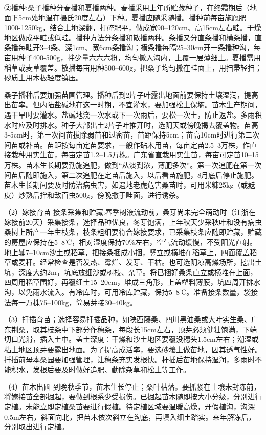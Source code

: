 \documentclass{ctexbook}
\begin{document}
②播种:桑子播种分春播和夏播两种。春播采用上年所贮藏种子，在终霜期后（地面下5cm处地温在摄氏20度左右）下种。夏播应随采随播。播种前每亩施厩肥1000-1250kg，结合土地深翻，打碎耙平，做成宽90--120cm、高15cm左右畦。干燥地区做成平畦或低畦。播种方法分条播和散播两种。条播又分直条播和横条播，直条播每畦开3--4条、深1cm、宽6cm条播沟；横条播每隔25--30cm开一条播种沟，每亩用种子400-500g，拌少量六六六粉，均匀撒入沟内，上覆一层薄细土。夏播需用稻草或麦草覆盖。散播每亩用种500--600g，把桑子均匀撒在畦面上，用扫帚轻扫；砂质土用木板轻度镇压。

桑子播种后要加强苗圃管理。播种后到2片子叶露出地面前要保持土壤湿润，提高出苗率。但内陆盐碱地在这一时期，不宜灌水，要加强松土保墒。苗木生产期间，遇干旱时要灌水。盐碱地浇一次水或下一次雨后，要松一次土，防止返盐。多雨积水时应及时排水。种子大部出土2片子叶推开时，选阴天或傍晚揭去覆盖物。苗高3-5cm时，第一次间苗拔除弱苗和过密苗，苗距保持5cm；苗高10cm时进行第二次间苗或补苗。苗距按每亩定苗要求，一般作砧木用苗，每亩定苗2.5--3万株，作直接栽种用实生苗，每亩定苗1.2--1.5万株。广东省直栽用实生苗，每亩可定苗10--15万株。苗木生长期要勤施追肥，做到“从淡到浓，薄肥多次”。第一次追肥在第一次间苗后随即施入，第二次追肥在定苗后施入，以后看苗施肥，8月底后停止施肥。苗木生长期间要及时防治病虫害，如遇地老虎危害桑苗时，可用米糠25kg（或麸皮）炒熟后拌和敌百虫500g，傍晚撒于畦面，进行诱杀。

（2）嫁接育苗
接条采集和贮藏:春季树液流动前，桑芽尚未完全萌动时（江浙在嫁接前20天）采集接条，选择品种优良，冬芽饱满，上年秋天少采秋叶和没有病虫桑树上所产一年生枝条，枝条粗细要符合嫁接要求，已采集枝条应随即贮藏，贮藏的房屋应保持在5--8℃，相对湿度保持70\%左右，空气流动缓慢，不受阳光直射。地上辅7--10cm沙土或稻草，把接条捆成小捆，竖立或横堆在稻草上，四面覆盖稻草或麦秆。经常检查是否发热、霉烂、发芽、干枯。也可选阴凉高燥场所，挖出土坑，深度大约2m，坑底放细沙或树枝、杂草。将已捆好桑条直立或横堆在上面，四周用稻草围好，再覆细土15--20cm，堆成三角形，上盖塑料薄膜，坑四周开排水沟，以免雨水流入。有冷库时，可用冷库贮藏，保持5--8℃。准备接条数量，袋接法每一万株75--100kg，简易芽接30--40kg。

（3）扦插育苗；选择容易扦插品种，如陕西藤桑、四川黑油桑或大叶实生桑、广东荆桑，取其枝条中下部分作穗条，每段长15cm左右，顶芽必须健壮饱满，下端切口光滑，插入土中。盖土深度：干燥和沙土地区要覆没穗头1.5cm左右；潮湿或粘土地区顶芽要露出地面。为了提高成活率，要选砂壤土做苗地，因其透气性好。扦插前母本桑园要加强管理，让穗条充实发根快。杆插后苗地保持湿润，多雨时不能积水，发根后要及时做好追肥、勤除杂草和松土等工作。

（4）苗木出圃 到晚秋季节，苗木生长停止；桑叶枯落。要抓紧在土壤未封冻前，将嫁接苗全部掘起，要做到根系少受损伤。已掘起苗木随即按大小分级，分别进行定植。未能立即定植桑苗要进行假植。待定植区域要温暖高燥，开假植沟，沟深0.5m左右，斜面向北，把苗木依次斜立在沟底，再填入细土踏实。来年解冻后，分别取出进行定植。
\end{document}

